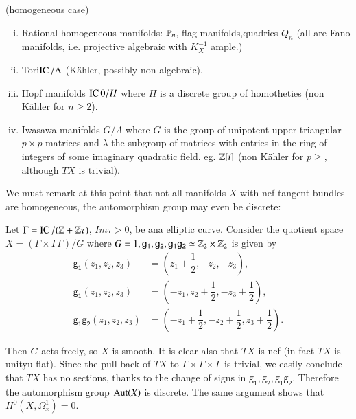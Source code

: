 \begin{secexams}(homogeneous case)\label{chap5-example-3.2}
    \begin{enumerate}[(i)]
    \item Rational homogeneous manifolds: $\mathbb{P}_{n}$, flag manifolds,quadrics $Q_{n}$ (all are Fano manifolds, i.e. projective algebraic with $K_{X}^{-1}$ ample.)\label{chap5-enu-{i}}
     \item Tori\pageoriginale $\operatorname{IC}/\Lambda$
     (K\"ahler, possibly non algebraic). \label{chap5-enu-{ii}}   
    \item Hopf manifolds $\operatorname{IC}{0}/H$ where $H$ is a discrete group of homotheties (non K\"ahler for $n\geq 2$).\label{chap5-enu-{iii}}
    \item Iwasawa manifolds $G/\Lambda$ where $G$ is the group of unipotent upper triangular $p\times p$ matrices and $\lambda$ the subgroup of matrices with entries in the ring of integers of some imaginary quadratic field. eg. $\mathbb{Z}[i]$ (non K\"ahler for $p\geq$, although $TX$ is trivial).\label{chap5-enu-{iv}}
    \end{enumerate}
\end{secexams}

We must remark at this point that not all manifolds $X$ with nef tangent bundles are homogeneous, the automorphism group may even be discrete:

\begin{secexam}\label{chap5-example-3.3}
Let $\Gamma = \operatorname{IC}/(\mathbb{Z} + \mathbb{Z} \tau)$, $Im\tau > 0$, be ana elliptic curve. Consider the quotient space $X = (\Gamma \times \Gamma \Gamma)/G $ where $G={1, \mathsf{g_{1}}, \mathsf{g_{2}}, \mathsf{g_{1}}\mathsf{g_{2}}} \simeq \mathbb{Z}_{2} \times \mathbb{Z}_{2}$ is given by
\begin{align*}
\mathsf{g_{1}}(z_{1}, z_{2}, z_{3}) &= \left(z_{1} + \dfrac{1}{2}, -z_{2}, -z_{3}\right),\\
\mathsf{g_{1}}(z_{1}, z_{2}, z_{3}) &= \left(-z_{1}, z_{2}+ \dfrac{1}{2}, -z_{3}+ \dfrac{1}{2}\right),\\
\mathsf{g_{1}g_{2}}(z_{1}, z_{2}, z_{3})& =\left(-z_{1}+\dfrac{1}{2}, -z_{2}+\dfrac{1}{2}, z_{3}+ \dfrac{1}{2}\right).
\end{align*}

Then $G$ acts freely, so $X$ is smooth. It is clear also that $TX$ is nef (in fact $TX$ is unityu flat). Since the pull-back of $TX$ to $\Gamma \times \Gamma \times \Gamma$ is trivial, we easily conclude that $TX$ has no sections, thanks to the change of signs in $ \mathsf{g_{1}}, \mathsf{g_{2}}, \mathsf{g_{1}g_{2}}$. Therefore the automorphism group $\operatorname{Aut}(X)$ is discrete. The same argument shows that $H^{0}(X, \Omega_{x}^{1}) = 0$.
\end{secexam}

